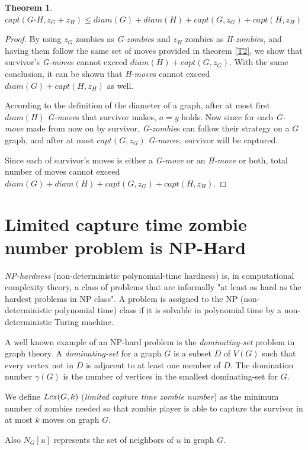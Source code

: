 \documentclass[1p]{elsarticle}
\newtheorem{theorem}{Theorem}
\newcommand{\zn}{\ooalign{$z$\cr\hfil\rule[.5ex]{.2em}{.08ex}\hfil\cr}}
\begin{document}
	\begin{theorem}
		\label{T5}
		$capt( G \square H, z_G + z_H ) \leq diam(G) + diam(H) + capt(G, z_G) + capt(H, z_H)$
	\end{theorem}
	\begin{proof}
		By using $z_G$ zombies as {\it G-zombie}s and $z_H$ zombies as {\it H-zombie}s, and having them follow the same
		set of moves provided in theorem \ref{T2}, we show that survivor's {\it G-move}s cannot exceed $diam(H)
		+ capt(G, z_G)$. With the same conclusion, it can be shown that {\it H-move}s cannot exceed $diam(G) + capt(H, z_H)$
		as well.

		According to the definition of the diameter of a graph, after at most first $diam(H)$ {\it G-move}s that
		survivor makes, $a = y$ holds. Now since for each {\it G-move} made from now on by survivor, {\it G-zombie}s can
		follow their strategy on a $G$ graph, and after at most $capt(G,z_G)$ {\it G-move}s, survivor will be captured. 
		
		Since each of survivor's moves is either a {\it G-move} or an {\it H-move} or both, total number of moves cannot
		exceed $diam(G) + diam(H) + capt(G, z_G) + capt(H, z_H)$.
	\end{proof}
\section{Limited capture time zombie number problem is NP-Hard}\label{np-capturetime}

	{\it NP-hardness} (non-deterministic polynomial-time hardness) is, in computational complexity theory, a class of
	problems that are informally "at least as hard as the hardest problems in NP class". A problem is assigned to the NP
	(non-deterministic polynomial time) class if it is solvable in polynomial time by a non-deterministic Turing
	machine.

	A well known example of an NP-hard problem is the {\it dominating-set} problem in graph theory. A {\it
	dominating-set} for a graph $G$ is a subset $D$ of $V(G)$ such that every vertex not in $D$ is adjacent to at least
	one member of $D$. The domination number $\gamma(G)$ is the number of vertices in the smallest dominating-set for
	$G$.

	We define $Lc\zn(G,k)$ ({\it limited capture time zombie number}) as the minimum number of zombies needed so that
	zombie player is able to capture the survivor in at most $k$ moves on graph $G$. 

	Also $N_G[u]$ represents the set of neighbors of $u$ in graph $G$.
	
\end{document}
